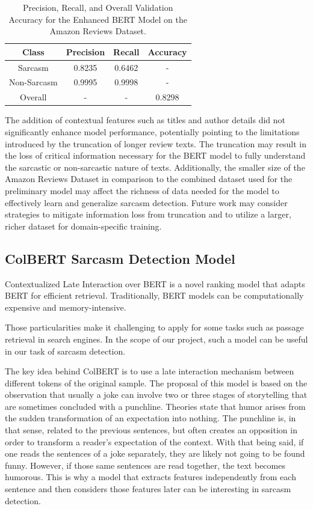\documentclass[10pt,twocolumn,letterpaper]{article}
\begin{document}
\begin{table}[H]  
    \centering  
    \begin{tabular}{|c|c|c|c|}  
        \hline  
        Class & Precision & Recall & Accuracy \\  
        \hline  
        Sarcasm & 0.8235 & 0.6462 & - \\  
        \hline  
        Non-Sarcasm & 0.9995 & 0.9998 & - \\  
        \hline  
        Overall & - & - & 0.8298 \\  
        \hline  
    \end{tabular}  
    \caption{Precision, Recall, and Overall Validation Accuracy for the Enhanced BERT Model on the Amazon Reviews Dataset.}  
    \label{tab:best_model_results}
\end{table}

The addition of contextual features such as titles and author details did not significantly enhance model performance, potentially pointing to the limitations introduced by the truncation of longer review texts. The truncation may result in the loss of critical information necessary for the BERT model to fully understand the sarcastic or non-sarcastic nature of texts. Additionally, the smaller size of the Amazon Reviews Dataset in comparison to the combined dataset used for the preliminary model may affect the richness of data needed for the model to effectively learn and generalize sarcasm detection. Future work may consider strategies to mitigate information loss from truncation and to utilize a larger, richer dataset for domain-specific training.
\subsection{ColBERT Sarcasm Detection Model}
Contextualized Late Interaction over BERT is a novel ranking model that adapts BERT for efficient retrieval.
Traditionally, BERT models can be computationally expensive and memory-intensive.

Those particularities make it challenging to apply for some tasks such as passage retrieval in search engines.
In the scope of our project, such a model can be useful in our task of sarcasm detection.

The key idea behind ColBERT is to use a late interaction mechanism between different tokens of the original sample.
The proposal of this model is based on the observation that usually a joke can involve two or three stages of storytelling that are sometimes concluded with a punchline.
Theories state that humor arises from the sudden transformation of an expectation into nothing.
The punchline is, in that sense, related to the previous sentences, but often creates an opposition in order to transform a reader's expectation of the context.
With that being said, if one reads the sentences of a joke separately, they are likely not going to be found funny.
However, if those same sentences are read together, the text becomes humorous.
This is why a model that extracts features independently from each sentence and then considers those features later can be interesting in sarcasm detection.
\end{document}
